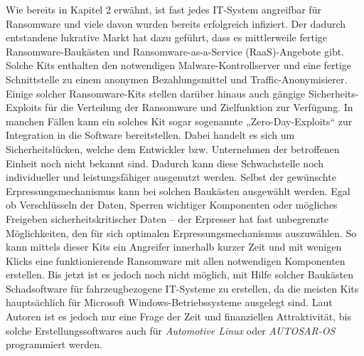 Wie bereits in Kapitel 2 erwähnt, ist fast jedes IT-System angreifbar 
für Ransomware und viele davon wurden bereits erfolgreich infiziert. 
Der dadurch entstandene lukrative Markt hat dazu geführt, dass es mittlerweile 
fertige Ransomware-Baukästen und Ransomware-as-a-Service (RaaS)-Angebote gibt. 
Solche Kits enthalten den notwendigen Malware-Kontrollserver und eine fertige 
Schnittstelle zu einem anonymen Bezahlungsmittel und Traffic-Anonymisierer. 
\newline
Einige solcher Ransomware-Kits stellen darüber hinaus auch gängige Sicherheits-Exploits 
für die Verteilung der Ransomware und Zielfunktion zur Verfügung. In manchen Fällen 
kann ein solches Kit sogar sogenannte „Zero-Day-Exploits“ zur Integration in die 
Software bereitstellen. Dabei handelt es sich um Sicherheitslücken, welche dem 
Entwickler bzw. Unternehmen der betroffenen Einheit noch nicht bekannt sind. Dadurch 
kann diese Schwachstelle noch individueller und leistungsfähiger ausgenutzt werden.
\newline
Selbst der gewünschte Erpressungsmechanismus kann bei solchen Baukästen ausgewählt 
werden. Egal ob Verschlüsseln der Daten, Sperren wichtiger Komponenten oder mögliches 
Freigeben sicherheitskritischer Daten – der Erpresser hat fast unbegrenzte Möglichkeiten, 
den für sich optimalen Erpressungsmechanismus auszuwählen.
\newline
So kann mittels dieser Kits ein Angreifer innerhalb kurzer Zeit und mit wenigen Klicks 
eine funktionierende Ransomware mit allen notwendigen Komponenten erstellen.
\newline
Bis jetzt ist es jedoch noch nicht möglich, mit Hilfe solcher Baukästen Schadsoftware 
für fahrzeugbezogene IT-Systeme zu erstellen, da die meisten Kits hauptsächlich für 
Microsoft Windows-Betriebssysteme ausgelegt sind. Laut Autoren ist es jedoch nur eine 
Frage der Zeit und finanziellen Attraktivität, bis solche Erstellungssoftwares auch für 
\textit{Automotive Linux} oder \textit{AUTOSAR-OS} programmiert werden. 
